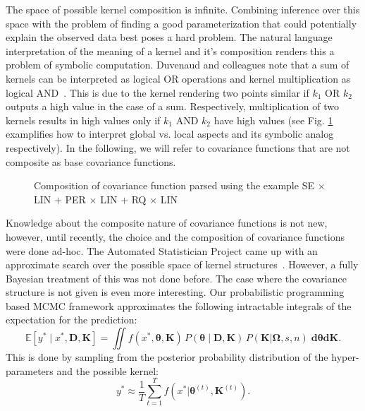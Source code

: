 The space of possible kernel composition is infinite. Combining inference over this space with the problem of finding a good parameterization that could potentially explain the observed data best poses a hard problem. The natural language interpretation of the meaning of a kernel and it's composition renders this a problem of symbolic computation. Duvenaud and colleagues note that a sum of kernels can be interpreted as logical OR operations and kernel multiplication as logical AND~\citeyearpar{duvenaud2013structure}. This is due to the kernel rendering two points similar if $k_1$ OR $k_2$ outputs a high value in the case of a sum. Respectively, multiplication of two kernels results in high values only if $k_1$ AND $k_2$ have high values (see Fig. \ref{fig:composite} examplifies how to interpret global vs. local aspects and its symbolic analog respectively). 
In the following, we will refer to covariance functions that are not composite as base covariance functions.

\begin{figure}
\centering

\caption{Composition of covariance function parsed using the example SE $\times$ LIN $+$ PER $\times$ LIN $+$  RQ $\times$ LIN}\label{fig:composite}
\end{figure}


Knowledge about the composite nature of covariance functions is not new, however, until recently, the choice and the composition of covariance functions were done ad-hoc. The Automated Statistician Project came up with an approximate search over the possible space of kernel structures~\citep{duvenaud2013structure,lloyd2014automatic}. However, a fully Bayesian treatment of this was not done before.
The case where the covariance structure is not given is even more interesting. Our probabilistic programming based MCMC framework approximates the following intractable integrals of the expectation for the prediction:
\begin{equation}
\mathbb{E}[y^* \mid x^*,\mathbf{D},\mathbf{K}] =\iint f(x^*,\bm{\theta},\mathbf{K})\,P(\bm{\theta} \mid \mathbf{D,\mathbf{K}})\,P(\mathbf{K}|\bm{\Omega},s,n) \; \mathbf{d} \bm{\theta} \mathbf{d} \mathbf{K}.  
\end{equation}
This is done by sampling from the posterior probability distribution of the hyper-parameters and the possible kernel:
\begin{equation}
y^* \approx \frac{1}{T} \sum^T_{t=1} f(x^* | \bm{\theta}^{(t)},\mathbf{K}^{(t)}). 
\end{equation}


